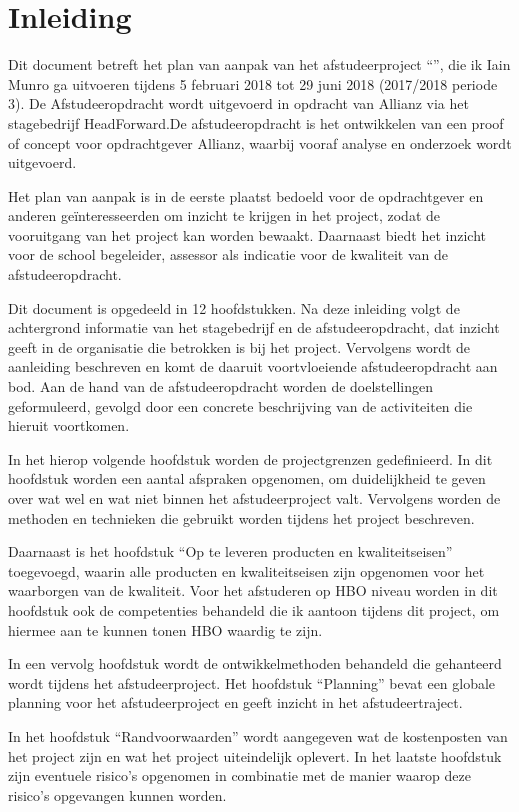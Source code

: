 \chapter{Inleiding}
Dit document betreft het plan van aanpak van het afstudeerproject ``\thesisTitle'', die ik Iain Munro ga uitvoeren tijdens 5 februari 2018 tot 29 juni 2018 (2017/2018 periode 3). De Afstudeeropdracht wordt uitgevoerd in opdracht van Allianz via het stagebedrijf HeadForward.De afstudeeropdracht is het ontwikkelen van een proof of concept voor opdrachtgever Allianz, waarbij vooraf analyse en onderzoek wordt uitgevoerd.\par

Het plan van aanpak is in de eerste plaatst bedoeld voor de opdrachtgever en anderen geïnteresseerden om inzicht te krijgen in het project, zodat de vooruitgang van het project kan worden bewaakt. Daarnaast biedt het inzicht voor de school begeleider, assessor als indicatie voor de kwaliteit van de afstudeeropdracht.\par

Dit document is opgedeeld in 12 hoofdstukken. Na deze inleiding volgt de achtergrond informatie van het stagebedrijf en de afstudeeropdracht, dat inzicht geeft in de organisatie die betrokken is bij het project. Vervolgens wordt de aanleiding beschreven en komt de daaruit voortvloeiende afstudeeropdracht aan bod. Aan de hand van de afstudeeropdracht worden de doelstellingen geformuleerd, gevolgd door een concrete beschrijving van de activiteiten die hieruit voortkomen.\par

In het hierop volgende hoofdstuk worden de projectgrenzen gedefinieerd. In dit hoofdstuk worden een aantal afspraken opgenomen, om duidelijkheid te geven over wat wel en wat niet binnen het afstudeerproject valt. Vervolgens worden de methoden en technieken die gebruikt worden tijdens het project beschreven.\par

Daarnaast is het hoofdstuk ``Op te leveren producten en kwaliteitseisen''  toegevoegd, waarin alle producten en kwaliteitseisen zijn opgenomen voor het waarborgen van de kwaliteit. Voor het afstuderen op HBO niveau worden in dit hoofdstuk ook de competenties behandeld die ik aantoon tijdens dit project, om hiermee aan te kunnen tonen HBO waardig te zijn. \par

In een vervolg hoofdstuk wordt de ontwikkelmethoden behandeld die gehanteerd wordt tijdens het afstudeerproject. Het hoofdstuk ``Planning'' bevat een globale planning voor het afstudeerproject en geeft inzicht in het afstudeertraject.\par

In het hoofdstuk ``Randvoorwaarden'' wordt aangegeven wat de kostenposten van het project zijn en wat het project uiteindelijk oplevert. In het laatste hoofdstuk zijn eventuele risico's opgenomen in combinatie met de manier waarop deze risico's opgevangen kunnen worden.